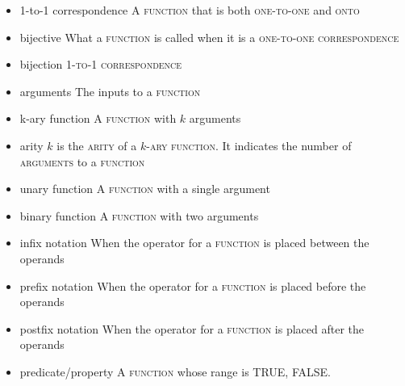 \documentclass{article}
\newcommand{\term}[1]{\textsc{#1}}
\begin{document}
\bigskip \indent
\begin{itemize}
\item 1-to-1 correspondence
   \subitem A \term{function} that is both \term{one-to-one} and \term{onto}
\item bijective
   \subitem  What a \term{function} is called when it is a \term{one-to-one correspondence}
\item bijection
   \subitem \term{1-to-1 correspondence}
\item arguments
   \subitem The inputs to a \term{function}
\item k-ary function
   \subitem A \term{function} with $k$ arguments
\item arity
   \subitem $k$ is the \term{arity} of a \term{$k$-ary function}. It indicates the number of \term{arguments} to a \term{function}
\item unary function
   \subitem A \term{function} with a single argument
\item binary function
   \subitem A \term{function} with two arguments
\item infix notation
   \subitem When the operator for a \term{function} is placed between the operands
\item prefix notation
   \subitem When the operator for a \term{function} is placed before the operands
\item postfix notation
   \subitem When the operator for a \term{function} is placed after the operands
\item predicate/property
   \subitem A \term{function} whose range is {TRUE, FALSE}.
\end{itemize}
\end{document}
